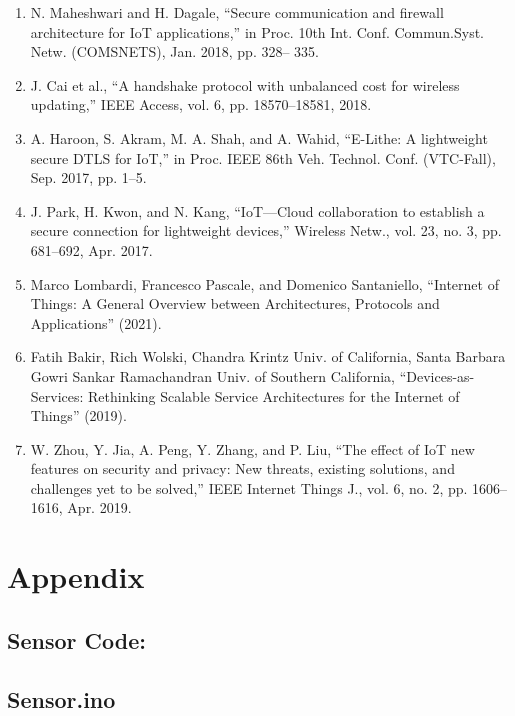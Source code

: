 \documentclass[12pt,a4paper,twocolumn,fleqn]{article}
\begin{document}
\begin{enumerate}
    \item N. Maheshwari and H. Dagale, “Secure communication and firewall architecture for IoT applications,” in Proc. 10th Int. Conf. Commun.Syst. Netw. (COMSNETS), Jan. 2018, pp. 328– 335.
    \item J. Cai et al., “A handshake protocol with unbalanced cost for wireless updating,” IEEE Access, vol. 6, pp. 18570–18581, 2018.
    \item A. Haroon, S. Akram, M. A. Shah, and A. Wahid, “E-Lithe: A lightweight secure DTLS for IoT,” in Proc. IEEE 86th Veh. Technol. Conf. (VTC-Fall), Sep. 2017, pp. 1–5.
    \item J. Park, H. Kwon, and N. Kang, “IoT—Cloud collaboration to establish a secure connection for lightweight devices,” Wireless Netw., vol. 23, no. 3, pp. 681–692, Apr. 2017.
    \item Marco Lombardi, Francesco Pascale, and Domenico Santaniello, “Internet of Things: A General Overview between Architectures, Protocols and Applications” (2021).
    \item Fatih Bakir, Rich Wolski, Chandra Krintz Univ. of California, Santa Barbara Gowri Sankar Ramachandran Univ. of Southern California, “Devices-as-Services: Rethinking Scalable Service Architectures for the Internet of Things” (2019). 
    \item W. Zhou, Y. Jia, A.   Peng, Y. Zhang, and P. Liu, “The effect of IoT new features on security and privacy: New threats, existing solutions, and challenges yet to be solved,” IEEE Internet Things J., vol. 6, no. 2, pp. 1606–1616, Apr. 2019.
\end{enumerate}
\newpage
  \pagestyle{fancy}
  \thispagestyle{empty}
  \thispagestyle{plain}
  \fancyhf{}
  \chead{}
\renewcommand{\footrulewidth}{0.4pt}%
\normalsize
\section{Appendix} 
\subsection*{Sensor Code:} 
\subsection*{Sensor.ino} 
\end{document}
